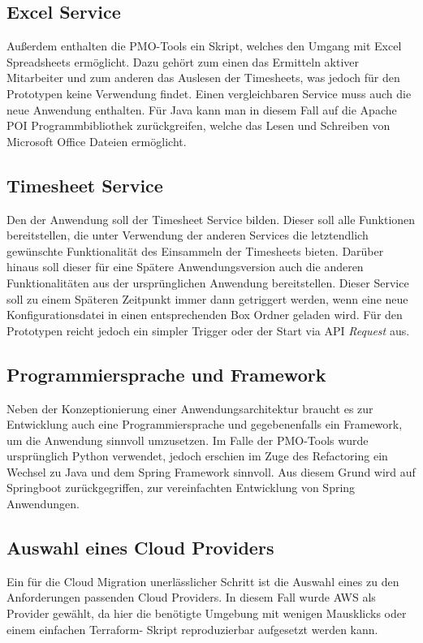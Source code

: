 \subsection{Excel Service}
Außerdem enthalten die PMO-Tools ein \grqq{} Skript, welches den Umgang mit Excel Spreadsheets ermöglicht. Dazu gehört zum einen das Ermitteln aktiver Mitarbeiter und zum anderen das Auslesen der Timesheets, was jedoch für den Prototypen keine Verwendung findet. Einen vergleichbaren Service muss auch die neue Anwendung enthalten. Für Java kann man in diesem Fall auf die Apache POI Programmbibliothek zurückgreifen, welche das Lesen und Schreiben von Microsoft Office Dateien ermöglicht.

\subsection{Timesheet Service}
Den \grqq{} der Anwendung soll der Timesheet Service bilden. Dieser soll alle Funktionen bereitstellen, die unter Verwendung der anderen Services die letztendlich gewünschte Funktionalität des Einsammeln der Timesheets bieten. Darüber hinaus soll dieser für eine Spätere Anwendungsversion auch die anderen Funktionalitäten aus der ursprünglichen Anwendung bereitstellen. Dieser Service soll zu einem Späteren Zeitpunkt immer dann getriggert werden, wenn eine neue Konfigurationsdatei in einen entsprechenden Box Ordner geladen wird. Für den Prototypen reicht jedoch ein simpler Trigger oder der Start via \ac{API} \textit{Request} aus. \pagebreak

\subsection{Programmiersprache und Framework}
Neben der Konzeptionierung einer Anwendungsarchitektur braucht es zur Entwicklung auch eine Programmiersprache und gegebenenfalls ein Framework, um die Anwendung sinnvoll umzusetzen. Im Falle der PMO-Tools wurde ursprünglich Python verwendet, jedoch erschien im Zuge des Refactoring ein Wechsel zu Java und dem \gls{Spring} Framework sinnvoll. Aus diesem Grund wird auf \gls{Springboot} zurückgegriffen, zur vereinfachten Entwicklung von \gls{Spring} Anwendungen.

\subsection{Auswahl eines Cloud Providers}
Ein für die Cloud Migration unerlässlicher Schritt ist die Auswahl eines zu den Anforderungen passenden Cloud Providers. In diesem Fall wurde \ac{AWS} als Provider gewählt, da hier die benötigte Umgebung mit wenigen Mausklicks oder einem einfachen \gls{Terraform}- Skript reproduzierbar aufgesetzt werden kann. \pagebreak